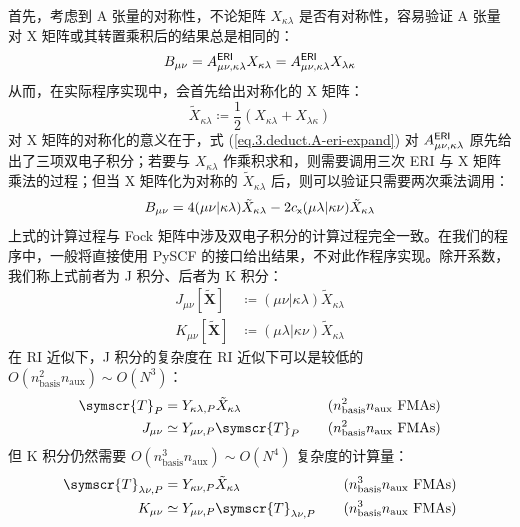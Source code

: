 首先，考虑到 A 张量的对称性，不论矩阵 $X_{\kappa \lambda}$ 是否有对称性，容易验证 A 张量对 X 矩阵或其转置乘积后的结果总是相同的：
\begin{equation*}
    B_{\mu \nu} = A_{\mu \nu, \kappa \lambda}^{\textsf{ERI}} X_{\kappa \lambda} = A_{\mu \nu, \kappa \lambda}^{\textsf{ERI}} X_{\lambda \kappa}
\end{equation*}
从而，在实际程序实现中，会首先给出对称化的 X 矩阵：
\begin{equation*}
    \tilde X_{\kappa \lambda} \coloneq \frac{1}{2} \left( X_{\kappa \lambda} + X_{\lambda \kappa} \right)
\end{equation*}
对 X 矩阵的对称化的意义在于，式 (\ref{eq.3.deduct.A-eri-expand}) 对 $A_{\mu \nu, \kappa \lambda}^{\textsf{ERI}}$ 原先给出了三项双电子积分；若要与 $X_{\kappa \lambda}$ 作乘积求和，则需要调用三次 ERI 与 X 矩阵乘法的过程；但当 X 矩阵化为对称的 $\tilde X_{\kappa \lambda}$ 后，则可以验证只需要两次乘法调用：
\begin{equation}
    \label{eq.3.A-contract-AO-JK}
    B_{\mu \nu} = 4 (\mu \nu | \kappa \lambda) \tilde X_{\kappa \lambda} - 2 c_{\textsf{x}} (\mu \lambda | \kappa \nu) \tilde X_{\kappa \lambda}
\end{equation}
上式的计算过程与 Fock 矩阵中涉及双电子积分的计算过程完全一致。在我们的程序中，一般将直接使用 PySCF 的接口给出结果，不对此作程序实现。除开系数，我们称上式前者为 J 积分、后者为 K 积分：
\begin{align}
    \label{eq.3.def.J}
    J_{\mu \nu} [\tilde{\mathbf{X}}] &\coloneq (\mu \nu | \kappa \lambda) \tilde X_{\kappa \lambda} \\
    \label{eq.3.def.K}
    K_{\mu \nu} [\tilde{\mathbf{X}}] &\coloneq (\mu \lambda | \kappa \nu) \tilde X_{\kappa \lambda}
\end{align}
在 RI 近似下，J 积分的复杂度在 RI 近似下可以是较低的 $O(n_\mathrm{basis}^2 n_\mathrm{aux}) \sim O(N^3)$：
\begin{alignat*}{10}
    \symscr{T}_{P} &= Y_{\kappa \lambda, P} \tilde X_{\kappa \lambda} &&\quad (n_\mathrm{basis}^2 n_\mathrm{aux} \text{ FMAs}) \\
    J_{\mu \nu} &\simeq Y_{\mu \nu, P} \symscr{T}_P &&\quad (n_\mathrm{basis}^2 n_\mathrm{aux} \text{ FMAs})
\end{alignat*}
但 K 积分仍然需要 $O(n_\mathrm{basis}^3 n_\mathrm{aux}) \sim O(N^4)$ 复杂度的计算量：
\begin{alignat*}{10}
    \symscr{T}_{\lambda \nu, P} &= Y_{\kappa \nu, P} \tilde X_{\kappa \lambda} &&\quad (n_\mathrm{basis}^3 n_\mathrm{aux} \text{ FMAs}) \\
    K_{\mu \nu} &\simeq Y_{\mu \nu, P} \symscr{T}_{\lambda \nu, P} &&\quad (n_\mathrm{basis}^3 n_\mathrm{aux} \text{ FMAs})
\end{alignat*}

